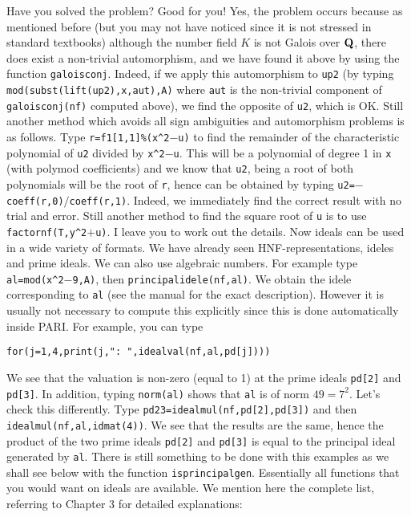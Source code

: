 Have you solved the problem? Good for you! Yes, the problem occurs because
as mentioned before (but you may not have noticed since it is not stressed
in standard textbooks) although the number field $K$ is not Galois over
${\bf Q}$, there does exist a non-trivial automorphism, and we have found it
above by using the function {\tt galoisconj}. Indeed, if we apply this
automorphism to {\tt up2} (by typing {\tt mod(subst(lift(up2),x,aut),A)}
where {\tt aut} is the non-trivial component of {\tt galoisconj(nf)}
computed above), we find the opposite of {\tt u2}, which is OK.
\smallskip
Still another method which avoids all sign ambiguities and automorphism
problems is as follows. Type {\tt r=f1[1,1]\%(x\^{}2$-$u)} to find the remainder
of the characteristic polynomial of {\tt u2} divided by {\tt x\^{}2$-$u}.
This will be a polynomial of degree 1 in {\tt x} (with polymod coefficients)
and we know that {\tt u2}, being a root of both polynomials will be the
root of {\tt r}, hence can be obtained by typing 
{\tt u2=$-$coeff(r,0)$/$coeff(r,1)}. Indeed, we immediately find the
correct result with no trial and error.
\smallskip
Still another method to find the square root of {\tt u} is to use
{\tt factornf(T,y\^{}2$+$u)}. I leave you to work out the details.
\smallskip
Now ideals can be used in a wide variety of formats. We have already seen
HNF-representations, ideles and prime ideals. We can also use algebraic
numbers. For example type {\tt al=mod(x\^{}2$-$9,A)}, then 
{\tt principalidele(nf,al)}. We obtain the idele corresponding to {\tt al}
(see the manual for the exact description). However it is usually not necessary
to compute this explicitly since this is done automatically inside PARI.
For example, you can type

\centerline{\tt for(j=1,4,print(j,": ",idealval(nf,al,pd[j])))}

We see that the valuation is non-zero (equal to 1) at the prime ideals 
{\tt pd[2]} and {\tt pd[3]}. In addition, typing {\tt norm(al)} shows that
{\tt al} is of norm $49=7^2$. Let's check this differently. Type 
{\tt pd23=idealmul(nf,pd[2],pd[3])} and then {\tt idealmul(nf,al,idmat(4))}.
We see that the results are the same, hence the product of the two prime
ideals {\tt pd[2]} and {\tt pd[3]} is equal to the principal ideal generated
by {\tt al}. There is still something to be done with this examples as we
shall see below with the function {\tt isprincipalgen}.
Essentially all functions that you would want on ideals are available.
We mention here the complete list, referring to Chapter 3 for detailed
explanations:

